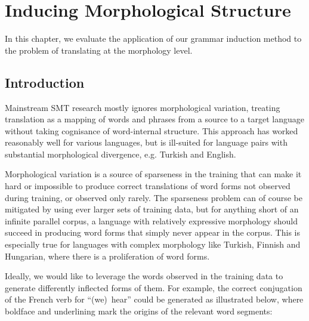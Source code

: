 \newcommand{\gloss}[1]{\glossa{(#1)}}%
\newcommand{\glossa}[1]{\begin{small}\textit{#1}\end{small}}
\newcommand{\pemph}[1]{\textbf{#1}}
\newcommand{\mmsz}{0.4\textwidth}
\newcommand{\mmultirow}[2]{\multirow{#1}{\mmsz}{#2}}

\chapter{Inducing Morphological Structure}

In this chapter, we evaluate the application of our grammar induction method to the problem of translating at the morphology level.

\section{Introduction}
Mainstream SMT research mostly ignores morphological variation, treating translation as a mapping of words and phrases from a source to a target language without taking cognisance of word-internal structure.
This approach has worked reasonably well for various languages, but is ill-suited for language pairs with substantial morphological divergence, e.g. Turkish and English.

Morphological variation is a source of sparseness in the training that can make it hard or impossible to produce correct translations of word forms not observed during training, or observed only rarely.
The sparseness problem can of course be mitigated by using ever larger sets of training data, but for anything short of an infinite parallel corpus, a language with relatively expressive morphology should succeed in producing word forms that simply never appear in the corpus.
This is especially true for languages with complex morphology like Turkish, Finnish and Hungarian, where there is a proliferation of word forms.

Ideally, we would like to leverage the words observed in the training data to generate differently inflected forms of them.
For example, the correct conjugation of the French verb for ``(we)~hear'' could be generated as illustrated below, where boldface and underlining mark the origins of the relevant word segments:

